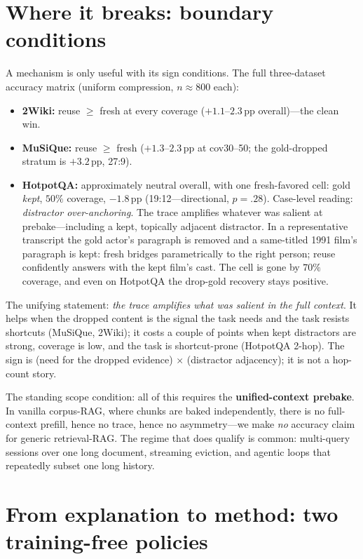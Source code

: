 \documentclass{article} %
\newcommand{\pp}{\,\mathrm{pp}}
\begin{document}
\section{Where it breaks: boundary conditions}
\label{sec:boundary}

A mechanism is only useful with its sign conditions. The full three-dataset accuracy matrix (uniform compression, $n\approx800$ each):

\begin{itemize}[leftmargin=2em]
\item \textbf{2Wiki:} reuse $\geq$ fresh at every coverage ($+1.1$--$2.3\pp$ overall)---the clean win.
\item \textbf{MuSiQue:} reuse $\geq$ fresh ($+1.3$--$2.3\pp$ at cov30--50; the gold-dropped stratum is $+3.2\pp$, 27:9).
\item \textbf{HotpotQA:} approximately neutral overall, with one fresh-favored cell: gold \emph{kept}, $50\%$ coverage, $-1.8\pp$ (19:12---directional, $p{=}.28$). Case-level reading: \emph{distractor over-anchoring}. The trace amplifies whatever was salient at prebake---including a kept, topically adjacent distractor. In a representative transcript the gold actor's paragraph is removed and a same-titled 1991 film's paragraph is kept: fresh bridges parametrically to the right person; reuse confidently answers with the kept film's cast. The cell is gone by $70\%$ coverage, and even on HotpotQA the drop-gold recovery stays positive.
\end{itemize}

The unifying statement: \emph{the trace amplifies what was salient in the full context}. It helps when the dropped content is the signal the task needs and the task resists shortcuts (MuSiQue, 2Wiki); it costs a couple of points when kept distractors are strong, coverage is low, and the task is shortcut-prone (HotpotQA 2-hop). The sign is (need for the dropped evidence) $\times$ (distractor adjacency); it is not a hop-count story.

The standing scope condition: all of this requires the \textbf{unified-context prebake}. In vanilla corpus-RAG, where chunks are baked independently, there is no full-context prefill, hence no trace, hence no asymmetry---we make \emph{no} accuracy claim for generic retrieval-RAG. The regime that does qualify is common: multi-query sessions over one long document, streaming eviction, and agentic loops that repeatedly subset one long history.

\section{From explanation to method: two training-free policies}
\label{sec:policies}
\end{document}
